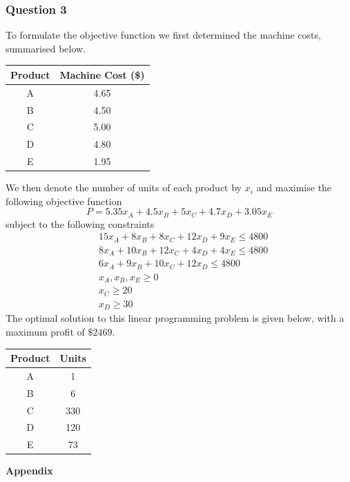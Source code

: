 \documentclass[11pt,a4paper]{article}
\begin{document}
\subsubsection*{Question 3}
To formulate the objective function we first determined the machine costs, summarised below.
\begin{center}
	\begin{tabular}{|c|c|}
		\hline
		Product &Machine Cost (\$) \\
		\hline
		A &4.65 \\
		B &4.50 \\
		C &5.00 \\
		D &4.80 \\
		E &1.95 \\
		\hline
	\end{tabular}
\end{center}
We then denote the number of units of each product by $x_i$ and maximise the following objective function
$$P=5.35x_A+4.5x_B+5x_C+4.7x_D+3.05x_E$$
subject to the following constraints
\begin{align*}
	&15x_A+8x_B+8x_C+12x_D+9x_E \le 4800 \\
	&8x_A+10x_B+12x_C+4x_D+4x_E \le 4800 \\
	&6x_A+9x_B+10x_C+12x_D \le 4800 \\
	&x_A, x_B, x_E \ge 0 \\
	&x_C \ge 20 \\
	&x_D \ge 30
\end{align*}
The optimal solution to this linear programming problem is given below, with a maximum profit of $\$2469$.
\begin{center}
	\begin{tabular}{|c|c|}
		\hline
		Product &Units \\
		\hline
		A &1 \\
		B &6 \\
		C &330 \\
		D &120 \\
		E &73 \\
		\hline
	\end{tabular}
\end{center}

\pagebreak

\textbf{Appendix}
\end{document}
